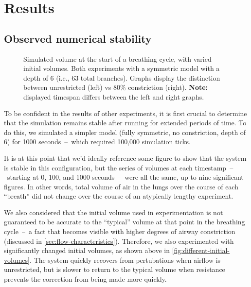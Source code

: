 %
\section{Results} \label{sec:results}

\subsection{Observed numerical stability}

\begin{figure}[ht!]
    \centering
    \begin{tikzpicture}[scale=0.8]
        
        
    \end{tikzpicture}
    \caption{
        Simulated volume at the start of a breathing cycle, with varied initial volumes. Both
        experiments with a symmetric model with a depth of 6 (i.e., 63 total branches). Graphs
        display the distinction between unrestricted (left) vs 80\% constriction (right).
        \textbf{Note:} displayed timespan differs between the left and right graphs.
    }
    \label{fig:different-initial-volumes}
\end{figure}

To be confident in the results of other experiments, it is first crucial to determine that the
simulation remains stable after running for extended periods of time. To do this, we simulated a
simpler model (fully symmetric, no constriction, depth of 6) for 1000 seconds~--~which required
100,000 simulation ticks.

It is at this point that we'd ideally reference some figure to show that the system is stable in
this configuration, but the series of volumes at each timestamp~--~starting at 0, 100, and 1000
seconds~--~were all the same, up to nine significant figures. In other words, total volume of air in
the lungs over the course of each ``breath'' did not change over the course of an atypically lengthy
experiment.

\breakpars

We also considered that the initial volume used in experimentation is not guaranteed to be accurate
to the ``typical'' volume at that point in the breathing cycle~--~a fact that becomes visible with
higher degrees of airway constriction (discussed in \autoref{sec:flow-characteristics}). Therefore,
we also experimented with significantly changed initial volumes, as shown above in
\autoref{fig:different-initial-volumes}. The system quickly recovers from pertubations when airflow
is unrestricted, but is slower to return to the typical volume when resistance prevents the
correction from being made more quickly.

